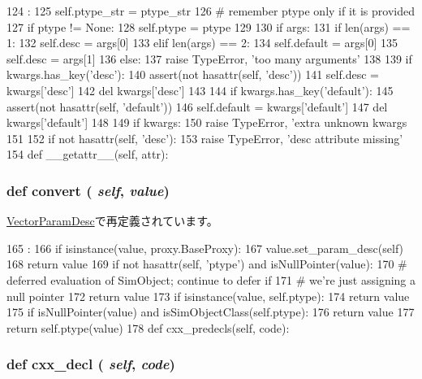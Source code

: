\begin{DoxyCode}
124                                                          :
125         self.ptype_str = ptype_str
126         # remember ptype only if it is provided
127         if ptype != None:
128             self.ptype = ptype
129 
130         if args:
131             if len(args) == 1:
132                 self.desc = args[0]
133             elif len(args) == 2:
134                 self.default = args[0]
135                 self.desc = args[1]
136             else:
137                 raise TypeError, 'too many arguments'
138 
139         if kwargs.has_key('desc'):
140             assert(not hasattr(self, 'desc'))
141             self.desc = kwargs['desc']
142             del kwargs['desc']
143 
144         if kwargs.has_key('default'):
145             assert(not hasattr(self, 'default'))
146             self.default = kwargs['default']
147             del kwargs['default']
148 
149         if kwargs:
150             raise TypeError, 'extra unknown kwargs %
151 
152         if not hasattr(self, 'desc'):
153             raise TypeError, 'desc attribute missing'
154 
    def __getattr__(self, attr):
\end{DoxyCode}
\hypertarget{classm5_1_1params_1_1ParamDesc_afe69e9190aa0b3889a9a5f63a42799f5}{
\subsubsection[{convert}]{\setlength{\rightskip}{0pt plus 5cm}def convert ( {\em self}, \/   {\em value})}}
\label{classm5_1_1params_1_1ParamDesc_afe69e9190aa0b3889a9a5f63a42799f5}


\hyperlink{classm5_1_1params_1_1VectorParamDesc_afe69e9190aa0b3889a9a5f63a42799f5}{VectorParamDesc}で再定義されています。


\begin{DoxyCode}
165                             :
166         if isinstance(value, proxy.BaseProxy):
167             value.set_param_desc(self)
168             return value
169         if not hasattr(self, 'ptype') and isNullPointer(value):
170             # deferred evaluation of SimObject; continue to defer if
171             # we're just assigning a null pointer
172             return value
173         if isinstance(value, self.ptype):
174             return value
175         if isNullPointer(value) and isSimObjectClass(self.ptype):
176             return value
177         return self.ptype(value)
178 
    def cxx_predecls(self, code):
\end{DoxyCode}
\hypertarget{classm5_1_1params_1_1ParamDesc_a723cbb1dc9ae0e7f3d102c6678f181c0}{
\subsubsection[{cxx\_\-decl}]{\setlength{\rightskip}{0pt plus 5cm}def cxx\_\-decl ( {\em self}, \/   {\em code})}}
\label{classm5_1_1params_1_1ParamDesc_a723cbb1dc9ae0e7f3d102c6678f181c0}


